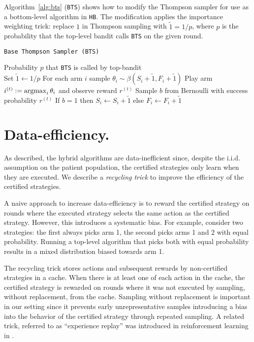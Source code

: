 Algorithm~\ref{alg:bts} (\texttt{BTS}) shows how to modify the Thompson sampler for use as a bottom-level algorithm in \texttt{HB}. The modification applies the importance weighting trick: replace $1$ in Thompson sampling with $\tilde{1}=1/p$, where $p$ is the probability that the top-level bandit calls \texttt{BTS} on the given round. 


\begin{algorithm}[tb]
   \caption{\texttt{Base Thompson Sampler (BTS)}}
   \label{alg:bts}
   \begin{algorithmic}
   	 Probability $p$ that \texttt{BTS} is called by top-bandit\\
   	\STATE Set $\tilde{1}\leftarrow 1/p$
   	 \STATE For each arm $i$ sample $\theta_i\sim\beta(S_i +\tilde{1},F_i +\tilde{1})$
	\STATE Play arm $i^{(t)} := \operatorname*{argmax}_i \theta_i$ and observe reward $r^{(t)}$
	\STATE Sample $b$ from Bernoulli with success probability $r^{(t)}$
	\STATE If $b=1$ then $S_i \leftarrow S_i + \tilde{1}$ else $F_i\leftarrow F_i+\tilde{1}$
   	\end{algorithmic}
\end{algorithm}




\section{Data-efficiency.}

As described, the hybrid algorithms are data-inefficient since, despite the i.i.d. assumption on the patient population, the certified strategies only learn when they are executed. We describe a \emph{recycling trick} to improve the efficiency of the certified strategies. 

A naive approach to increase data-efficiency is to reward the certified strategy on rounds where the executed strategy selects the same action as the certified strategy. However, this introduces a systematic bias. For example, consider two strategies: the first always picks arm 1, the second picks arms 1 and 2 with equal probability. Running a top-level algorithm that picks both with equal probability results in a mixed distribution biased towards arm 1.

The recycling trick stores actions and subsequent rewards by non-certified strategies in a cache. When there is at least one of each action in the cache, the certified strategy is rewarded on rounds where it was not executed by sampling, without replacement, from the cache. Sampling without replacement is important in our setting since it prevents early unrepresentative samples introducing a bias into the behavior of the certified strategy through repeated sampling. A related trick, referred to as ``experience replay'' was introduced in reinforcement learning in \cite{Mnih:2015wq}. 
